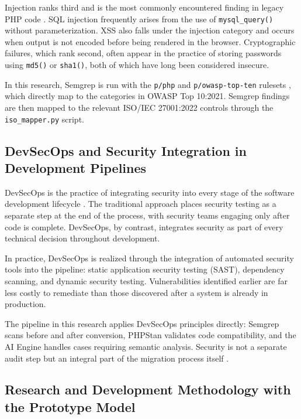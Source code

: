 Injection ranks third and is the most commonly encountered finding in legacy PHP code \cite{owasp2021}. SQL injection frequently arises from the use of \texttt{mysql\_query()} without parameterization. XSS also falls under the injection category and occurs when output is not encoded before being rendered in the browser. Cryptographic failures, which rank second, often appear in the practice of storing passwords using \texttt{md5()} or \texttt{sha1()}, both of which have long been considered insecure.

In this research, Semgrep is run with the \texttt{p/php} and \texttt{p/owasp-top-ten} rulesets \cite{semgrep2024}, which directly map to the categories in OWASP Top 10:2021. Semgrep findings are then mapped to the relevant ISO/IEC 27001:2022 controls through the \texttt{iso\_mapper.py} script.

\subsection{DevSecOps and Security Integration in Development Pipelines}

DevSecOps is the practice of integrating security into every stage of the software development lifecycle \cite{li2025software}. The traditional approach places security testing as a separate step at the end of the process, with security teams engaging only after code is complete. DevSecOps, by contrast, integrates security as part of every technical decision throughout development.

In practice, DevSecOps is realized through the integration of automated security tools into the pipeline: static application security testing (SAST), dependency scanning, and dynamic security testing. Vulnerabilities identified earlier are far less costly to remediate than those discovered after a system is already in production.

The pipeline in this research applies DevSecOps principles directly: Semgrep scans before and after conversion, PHPStan validates code compatibility, and the AI Engine handles cases requiring semantic analysis. Security is not a separate audit step but an integral part of the migration process itself \cite{iso27001_2022}.

\subsection{Research and Development Methodology with the Prototype Model}
\label{subsec:model-prototipe}

